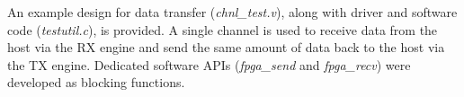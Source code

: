 An example design for data transfer (\textit{chnl\_test.v}), along with driver and software code (\textit{testutil.c}), is provided.
A single channel is used to receive data from the host via the RX engine and send the same amount of data back to the host via the TX engine. 
Dedicated software APIs (\textit{fpga\_send} and \textit{fpga\_recv}) were developed as blocking functions.
